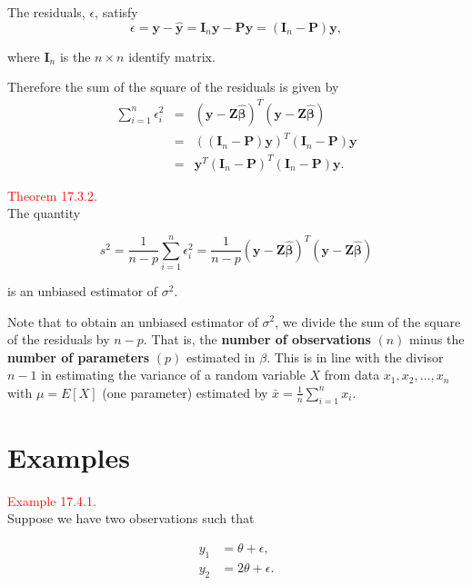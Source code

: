 \documentclass[
]{book}
\begin{document}
The residuals, \(\epsilon\), satisfy\\

\[ \epsilon = \mathbf{y} - \hat{\mathbf{y}} = \mathbf{I}_n \mathbf{y} -  \mathbf{P}\mathbf{y} = (\mathbf{I}_n -  \mathbf{P})\mathbf{y}, \]

where \(\mathbf{I}_n\) is the \(n \times n\) identify matrix.

Therefore the sum of the square of the residuals is given by\\

\begin{eqnarray*} \sum_{i=1}^n \epsilon^2_i &=& (\mathbf{y} - \mathbf{Z} \mathbf{\hat{\beta}})^T(\mathbf{y} - \mathbf{Z} \mathbf{\hat{\beta}}) \\ &=& ((\mathbf{I}_n -  \mathbf{P})\mathbf{y})^T (\mathbf{I}_n -  \mathbf{P})\mathbf{y} \\ &=& \mathbf{y}^T (\mathbf{I}_n -  \mathbf{P})^T (\mathbf{I}_n -  \mathbf{P}) \mathbf{y}. 
\end{eqnarray*}

\hypertarget{Sec_Linear_LSE:thm:var}{}
\textcolor{red}{Theorem 17.3.2.}\\
The quantity

\[s^2 = \frac{1}{n-p} \sum_{i=1}^n \epsilon_i^2= \frac{1}{n-p}(\mathbf{y} - \mathbf{Z} \mathbf{\hat{\beta}})^T(\mathbf{y} - \mathbf{Z} \mathbf{\hat{\beta}})\]

is an unbiased estimator of \(\sigma^2\).

Note that to obtain an unbiased estimator of \(\sigma^2\), we divide the sum of the square of the residuals by \(n-p\). That is, the \textbf{number of observations} \((n)\) minus the \textbf{number of parameters} \((p)\) estimated in \(\beta\). This is in line with the divisor \(n-1\) in estimating the variance of a random variable \(X\) from data \(x_1, x_2, \ldots, x_n\) with \(\mu = E[X]\) (one parameter) estimated by \(\bar{x} = \frac{1}{n} \sum_{i=1}^n x_i\).

\hypertarget{Sec_Linear_LSE:examples}{%
\section{Examples}\label{Sec_Linear_LSE:examples}}

\leavevmode{}%
\textcolor{red}{Example 17.4.1.}\\
Suppose we have two observations such that

\begin{align*}
y_1 &= \theta + \epsilon, \\ 
y_2 &= 2\theta + \epsilon.
\end{align*}
\end{document}
